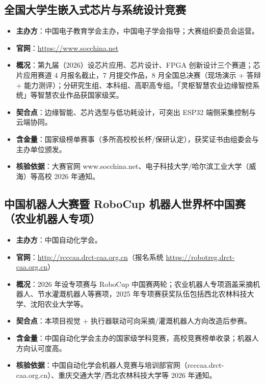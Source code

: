 \documentclass[11pt]{ctexart}
\begin{document}
\subsection{全国大学生嵌入式芯片与系统设计竞赛}
\begin{itemize}
  \item \textbf{主办方}：中国电子教育学会主办，中国电子学会指导；大赛组织委员会运营。
  \item \textbf{官网}：\url{https://www.socchina.net}
  \item \textbf{概况}：第九届（2026）设芯片应用、芯片设计、FPGA 创新设计三个赛道；芯片应用赛道 4 月报名截止，7 月提交作品，8 月全国总决赛（现场演示 + 答辩 + 能力测评）；分研究生组、本科组、高职高专组。「灵枢智慧农业边缘智控系统」等智慧农业作品获国家级奖。
  \item \textbf{契合点}：边缘智能、芯片选型与低功耗设计，可突出 ESP32 端侧采集控制与云端协同。
  \item \textbf{含金量}：国家级榜单赛事（多所高校校长杯/保研认定），获奖证书由组委会与主办单位颁发。
  \item \textbf{核验依据}：大赛官网 www.socchina.net、电子科技大学/哈尔滨工业大学（威海）等高校 2026 年通知。
\end{itemize}

\subsection{中国机器人大赛暨 RoboCup 机器人世界杯中国赛（农业机器人专项）}
\begin{itemize}
  \item \textbf{主办方}：中国自动化学会。
  \item \textbf{官网}：\url{http://rcccaa.drct-caa.org.cn}（报名系统 \url{https://robotreg.drct-caa.org.cn}）
  \item \textbf{概况}：2026 年设专项赛与 RoboCup 中国赛两轮；农业机器人专项涵盖采摘机器人、节水灌溉机器人等赛项，2025 年专项赛获奖队伍包括西北农林科技大学、沈阳农业大学等。
  \item \textbf{契合点}：本项目视觉 + 执行器联动可向采摘/灌溉机器人方向改造后参赛。
  \item \textbf{含金量}：中国自动化学会主办的国家级学科竞赛，高校竞赛榜单收录；机器人方向认可度高。
  \item \textbf{核验依据}：中国自动化学会机器人竞赛与培训部官网（rcccaa.drct-caa.org.cn）、重庆交通大学/西北农林科技大学等 2026 年通知。
\end{itemize}
\end{document}
